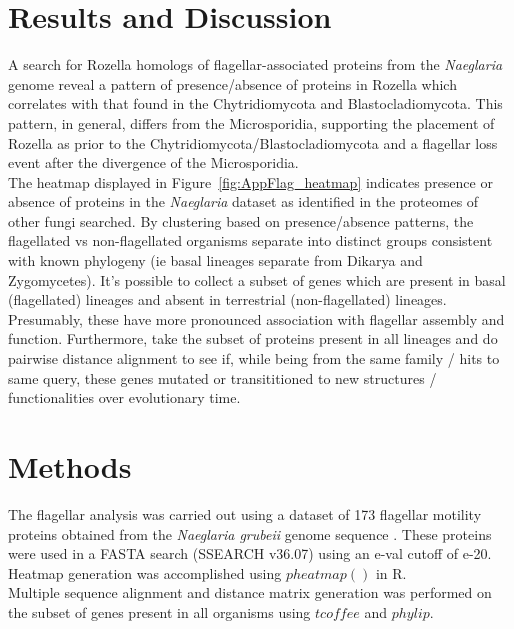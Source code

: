\section{Results and Discussion}
A search for Rozella homologs of flagellar-associated proteins from the \textit{Naeglaria} genome \cite{FritzLaylin2011} reveal a pattern of presence/absence of proteins in Rozella which correlates with that found in the Chytridiomycota and Blastocladiomycota. This pattern, in general, differs from the Microsporidia, supporting the placement of Rozella as prior to the Chytridiomycota/Blastocladiomycota and a flagellar loss event after the divergence of the Microsporidia. \\
\indent The heatmap displayed in Figure~\ref{fig:AppFlag_heatmap} indicates presence or absence of proteins in the \textit{Naeglaria} dataset as identified in the proteomes of other fungi searched. By clustering based on presence/absence patterns, the flagellated vs non-flagellated organisms separate into distinct groups consistent with known phylogeny (ie basal lineages separate from Dikarya and Zygomycetes). It's possible to collect a subset of genes which are present in basal (flagellated) lineages and absent in terrestrial (non-flagellated) lineages. Presumably, these have more pronounced association with flagellar assembly and function. Furthermore, take the subset of proteins present in all lineages and do pairwise distance alignment to see if, while being from the same family / hits to same query, these genes mutated or transititioned to new structures / functionalities over evolutionary time.\\
\section{Methods}
The flagellar analysis was carried out using a dataset of 173 flagellar motility proteins obtained from the \textit{Naeglaria grubeii} genome sequence \cite{FritzLaylin2011}. These proteins were used in a FASTA search (SSEARCH v36.07) using an e-val cutoff of e-20. Heatmap generation was accomplished using $pheatmap()$ in R.\\
\indent Multiple sequence alignment and distance matrix generation was performed on the subset of genes present in all organisms using $tcoffee$ and $phylip$.\\
